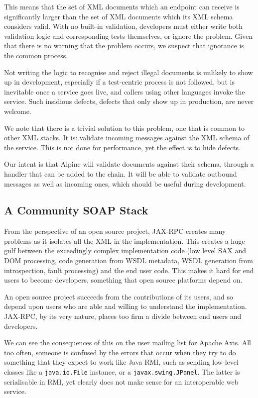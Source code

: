 This means that the set of XML documents which an endpoint can receive
is significantly larger than the set of XML documents which its XML
schema considers valid. With no built-in validation, developers must
either write both validation logic and corresponding tests themselves,
or ignore the problem. Given that there is no warning that the problem
occurs, we suspect that ignorance is the common process. 

Not writing the logic to recognise and reject illegal documents is
unlikely to show up in development, especially if a test-centric
process is not followed, but is inevitable once a service goes live,
and callers using other languages invoke the service. Such insidious
defects, defects that only show up in production, are never welcome.

We note that there is a trivial solution to this problem, one that is
common to other XML stacks. It is: validate incoming messages against
the XML schema of the service. This is not done for performance, yet
the effect is to hide defects.

Our intent is that Alpine will validate documents against their schema,
through a handler that can be added to the chain. It will be able to 
validate outbound messages as well as incoming ones, which should be useful
during development. 


\subsection{A Community SOAP Stack}
\label{alpine:community}
From the perspective of an open source project, JAX-RPC creates many
problems as it isolates all the XML in the implementation. This
creates a huge gulf between the exceedingly complex implementation
code (low level SAX and DOM processing, code generation from WSDL
metadata, WSDL generation from introspection, fault processing) and
the end user code.  This makes it hard for end users to become
developers, something that open source platforms depend on.  

An open source project succeeds from the contributions of its users,
and so depend upon users who are able and willing to understand the
implementation. JAX-RPC, by its very nature, places too firm a divide
between end users and developers.

We can see the consequences of this on the user mailing list for
Apache Axis. All too often, someone is confused by the errors that
occur when they try to do something that they expect to work like
Java RMI, such as sending low-level classes like a \verb|java.io.File|
instance, or a \verb|javax.swing.JPanel|. The latter is serialisable
in RMI, yet clearly does not make sense for an interoperable web
service.

